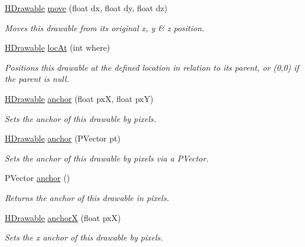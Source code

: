 \begin{DoxyCompactItemize}
\hyperlink{classhype_1_1drawable_1_1_h_drawable}{H\-Drawable} \hyperlink{classhype_1_1drawable_1_1_h_drawable_a11c1fec4c2f01bb4e86f42fd76800194}{move} (float dx, float dy, float dz)
\begin{DoxyCompactList}\small\item\em Moves this drawable from its original x, y \& z position. \end{DoxyCompactList}\item 
\hyperlink{classhype_1_1drawable_1_1_h_drawable}{H\-Drawable} \hyperlink{classhype_1_1drawable_1_1_h_drawable_a0ca3d835df3317d50723404b777d3a65}{loc\-At} (int where)
\begin{DoxyCompactList}\small\item\em Positions this drawable at the defined location in relation to its parent, or (0,0) if the parent is null. \end{DoxyCompactList}\item 
\hyperlink{classhype_1_1drawable_1_1_h_drawable}{H\-Drawable} \hyperlink{classhype_1_1drawable_1_1_h_drawable_a12df6048c645a3d076f5c6beda37820b}{anchor} (float px\-X, float px\-Y)
\begin{DoxyCompactList}\small\item\em Sets the anchor of this drawable by pixels. \end{DoxyCompactList}\item 
\hyperlink{classhype_1_1drawable_1_1_h_drawable}{H\-Drawable} \hyperlink{classhype_1_1drawable_1_1_h_drawable_a7e0b9a98e9920472ed92fd9c517a2299}{anchor} (P\-Vector pt)
\begin{DoxyCompactList}\small\item\em Sets the anchor of this drawable by pixels via a P\-Vector. \end{DoxyCompactList}\item 
P\-Vector \hyperlink{classhype_1_1drawable_1_1_h_drawable_a7ce0ca1f211ca11b7b69faa341a582b2}{anchor} ()
\begin{DoxyCompactList}\small\item\em Returns the anchor of this drawable in pixels. \end{DoxyCompactList}\item 
\hyperlink{classhype_1_1drawable_1_1_h_drawable}{H\-Drawable} \hyperlink{classhype_1_1drawable_1_1_h_drawable_a8328584252a6d346495091efea24e925}{anchor\-X} (float px\-X)
\begin{DoxyCompactList}\small\item\em Sets the x anchor of this drawable by pixels. \end{DoxyCompactList}\item 

\end{DoxyCompactItemize}
